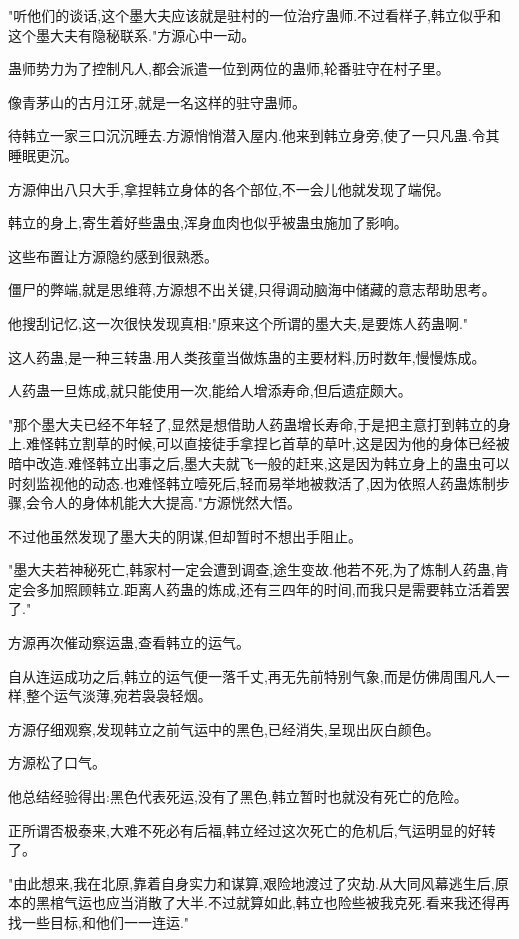 \begin{this_body}
"听他们的谈话,这个墨大夫应该就是驻村的一位治疗蛊师.不过看样子,韩立似乎和这个墨大夫有隐秘联系."方源心中一动。

蛊师势力为了控制凡人,都会派遣一位到两位的蛊师,轮番驻守在村子里。

像青茅山的古月江牙,就是一名这样的驻守蛊师。

待韩立一家三口沉沉睡去.方源悄悄潜入屋内.他来到韩立身旁,使了一只凡蛊.令其睡眠更沉。

方源伸出八只大手,拿捏韩立身体的各个部位,不一会儿他就发现了端倪。

韩立的身上,寄生着好些蛊虫,浑身血肉也似乎被蛊虫施加了影响。

这些布置让方源隐约感到很熟悉。

僵尸的弊端,就是思维蒋,方源想不出关键,只得调动脑海中储藏的意志帮助思考。

他搜刮记忆,这一次很快发现真相:"原来这个所谓的墨大夫,是要炼人药蛊啊."

这人药蛊,是一种三转蛊.用人类孩童当做炼蛊的主要材料,历时数年,慢慢炼成。

人药蛊一旦炼成,就只能使用一次,能给人增添寿命,但后遗症颇大。

"那个墨大夫已经不年轻了,显然是想借助人药蛊增长寿命,于是把主意打到韩立的身上.难怪韩立割草的时候,可以直接徒手拿捏匕首草的草叶,这是因为他的身体已经被暗中改造.难怪韩立出事之后,墨大夫就飞一般的赶来,这是因为韩立身上的蛊虫可以时刻监视他的动态.也难怪韩立噎死后,轻而易举地被救活了,因为依照人药蛊炼制步骤,会令人的身体机能大大提高."方源恍然大悟。

不过他虽然发现了墨大夫的阴谋,但却暂时不想出手阻止。

"墨大夫若神秘死亡,韩家村一定会遭到调查,途生变故.他若不死,为了炼制人药蛊,肯定会多加照顾韩立.距离人药蛊的炼成,还有三四年的时间,而我只是需要韩立活着罢了."

方源再次催动察运蛊,查看韩立的运气。

自从连运成功之后,韩立的运气便一落千丈,再无先前特别气象,而是仿佛周围凡人一样,整个运气淡薄,宛若袅袅轻烟。

方源仔细观察,发现韩立之前气运中的黑色,已经消失,呈现出灰白颜色。

方源松了口气。

他总结经验得出:黑色代表死运,没有了黑色,韩立暂时也就没有死亡的危险。

正所谓否极泰来,大难不死必有后福,韩立经过这次死亡的危机后,气运明显的好转了。

"由此想来,我在北原,靠着自身实力和谋算,艰险地渡过了灾劫.从大同风幕逃生后,原本的黑棺气运也应当消散了大半.不过就算如此,韩立也险些被我克死.看来我还得再找一些目标,和他们一一连运."


\end{this_body}

